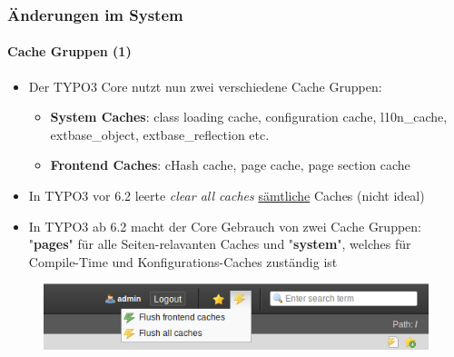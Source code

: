 \begin{frame}[fragile]
	\frametitle{Änderungen im System}
	\framesubtitle{Cache Gruppen (1)}

	\begin{itemize}
		\item Der TYPO3 Core nutzt nun zwei verschiedene Cache Gruppen:

			\begin{itemize}
				\item \textbf{System Caches}:
				class loading cache, configuration cache, l10n\_cache, extbase\_object, extbase\_reflection etc.
				\item \textbf{Frontend Caches}:
				cHash cache, page cache, page section cache
			\end{itemize}

		\item In TYPO3 vor 6.2 leerte \textit{clear all caches} \underline{sämtliche} Caches (nicht ideal)

		\item In TYPO3 ab 6.2 macht der Core Gebrauch von zwei Cache Gruppen:\newline
			"\textbf{pages}" für alle Seiten-relavanten Caches und "\textbf{system}", welches für Compile-Time und Konfigurations-Caches zuständig ist

	\end{itemize}

	\begin{figure}
		\includegraphics[width=0.5\linewidth]{Images/InDepthChanges/CacheGroups.png}
	\end{figure}

\end{frame}


